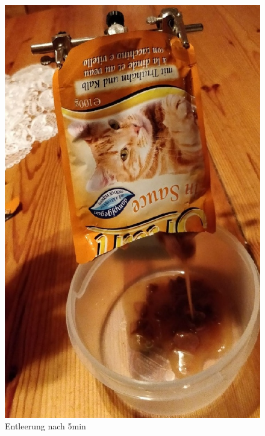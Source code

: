 \begin{figure}[H]
   \begin{minipage}[hbt]{.32\linewidth} %
      \includegraphics[width=\linewidth]{Bilder/Fuetterungsexperiment/Fuetterungs_Mitte}
      \caption{Entleerung nach 5min}
      \label{Fütterungs Mitte}
   \end{minipage}
   \hspace{.3\linewidth}%
   \begin{minipage}[hbt]{.33 \linewidth} %

\end{minipage}
\end{figure}
